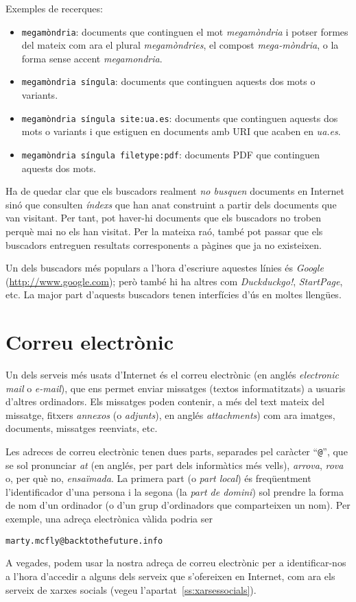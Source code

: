 Exemples de recerques:
\begin{itemize}
\item \texttt{megamòndria}: documents que continguen el mot
  \emph{megamòndria} i potser formes del mateix com ara el plural
  \emph{megamòndries}, el compost \emph{mega-mòndria}, o la forma
  sense accent \emph{megamondria}.
\item \texttt{megamòndria síngula}: documents que continguen aquests
  dos mots o variants.
\item \texttt{megamòndria síngula site:ua.es}: documents que
  continguen aquests dos mots o variants i que estiguen en documents
  amb URI que acaben en \emph{ua.es}.
\item \texttt{megamòndria síngula filetype:pdf}: documents PDF que
  continguen aquests dos mots.
\end{itemize}

Ha de quedar clar que els buscadors realment \emph{no busquen}
documents en Internet sinó que consulten \emph{índexs} que han anat
construint a partir dels documents que van visitant. Per tant, pot
haver-hi documents que els buscadors no troben perquè mai no els han
visitat. Per la mateixa raó, també pot passar que els buscadors
entreguen resultats corresponents a pàgines que ja no existeixen.

Un dels buscadors més populars a l'hora d'escriure aquestes línies és
\emph{Google} (\url{http://www.google.com}); però també hi ha altres
com \emph{Duckduckgo!}, \emph{StartPage}, etc. La major part d'aquests
buscadors tenen interfícies d'ús en moltes llengües.

\section{Correu electrònic}
\label{ss:correue}
Un dels serveis més usats d'Internet és el correu electrònic (en
anglés \emph{electronic mail} o \emph{e-mail}), que ens permet enviar
missatges (textos informatitzats) a usuaris d'altres ordinadors.  Els
missatges poden contenir, a més del text mateix del missatge, fitxers
\emph{annexos} (o \emph{adjunts}), en anglés \emph{attachments}) com
ara imatges, documents, missatges reenviats, etc.

Les adreces de correu electrònic tenen dues parts, separades pel
caràcter ``\texttt{@}'', que se sol pronunciar \emph{at} (en anglés,
per part dels informàtics més vells), {\em arrova}, \emph{rova} o, per
què no, \emph{ensaïmada}. La primera part (o \emph{part local}) és
freqüentment l'identificador d'una persona i la segona (la \emph{part
  de domini}) sol prendre la forma de nom d'un ordinador (o d'un grup
d'ordinadors que comparteixen un nom). Per exemple, una adreça
electrònica vàlida podria ser
\begin{center}
\texttt{marty.mcfly@backtothefuture.info}
\end{center}
A vegades, podem usar la nostra adreça de correu electrònic per a
identificar-nos a l'hora d'accedir a alguns dels serveix que
s'ofereixen en Internet, com ara els serveix de xarxes socials (vegeu
l'apartat~\ref{ss:xarsessocials}).

